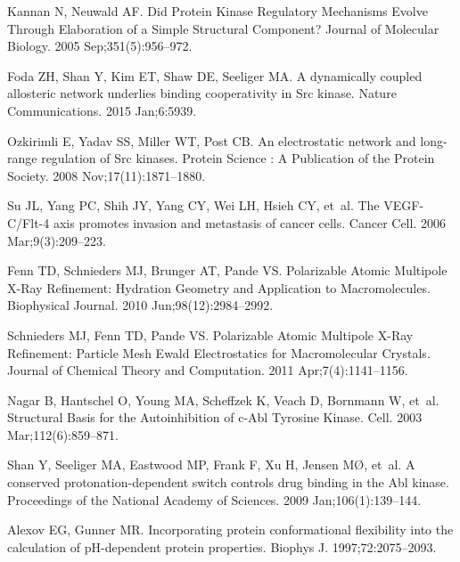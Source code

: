 \documentclass[10pt,letterpaper]{article}
\begin{document}
\begin{thebibliography}{100}
Kannan N, Neuwald AF.
\newblock Did {Protein} {Kinase} {Regulatory} {Mechanisms} {Evolve} {Through}
  {Elaboration} of a {Simple} {Structural} {Component}?
\newblock Journal of Molecular Biology. 2005 Sep;351(5):956--972.

Foda ZH, Shan Y, Kim ET, Shaw DE, Seeliger MA.
\newblock A dynamically coupled allosteric network underlies binding
  cooperativity in {Src} kinase.
\newblock Nature Communications. 2015 Jan;6:5939.

Ozkirimli E, Yadav SS, Miller WT, Post CB.
\newblock An electrostatic network and long-range regulation of {Src} kinases.
\newblock Protein Science : A Publication of the Protein Society. 2008
  Nov;17(11):1871--1880.

Su JL, Yang PC, Shih JY, Yang CY, Wei LH, Hsieh CY, et~al.
\newblock The {VEGF}-{C}/{Flt}-4 axis promotes invasion and metastasis of
  cancer cells.
\newblock Cancer Cell. 2006 Mar;9(3):209--223.

Fenn TD, Schnieders MJ, Brunger AT, Pande VS.
\newblock Polarizable {Atomic} {Multipole} {X}-{Ray} {Refinement}: {Hydration}
  {Geometry} and {Application} to {Macromolecules}.
\newblock Biophysical Journal. 2010 Jun;98(12):2984--2992.

Schnieders MJ, Fenn TD, Pande VS.
\newblock Polarizable {Atomic} {Multipole} {X}-{Ray} {Refinement}: {Particle}
  {Mesh} {Ewald} {Electrostatics} for {Macromolecular} {Crystals}.
\newblock Journal of Chemical Theory and Computation. 2011 Apr;7(4):1141--1156.

Nagar B, Hantschel O, Young MA, Scheffzek K, Veach D, Bornmann W, et~al.
\newblock Structural {Basis} for the {Autoinhibition} of c-{Abl} {Tyrosine}
  {Kinase}.
\newblock Cell. 2003 Mar;112(6):859--871.

Shan Y, Seeliger MA, Eastwood MP, Frank F, Xu H, Jensen M{\O}, et~al.
\newblock A conserved protonation-dependent switch controls drug binding in the
  {Abl} kinase.
\newblock Proceedings of the National Academy of Sciences. 2009
  Jan;106(1):139--144.

Alexov EG, Gunner MR.
\newblock Incorporating protein conformational flexibility into the calculation
  of {pH}-dependent protein properties.
\newblock Biophys J. 1997;72:2075--2093.


\end{thebibliography}
\end{document}

